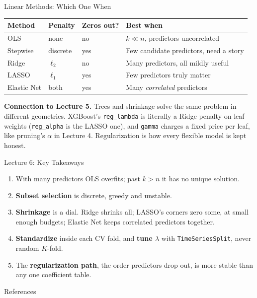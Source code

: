 \documentclass[aspectratio=169, 11pt]{beamer}
\begin{document}
\begin{frame}{Linear Methods: Which One When}
  \begin{center}
    {\small
    \begin{tabular}{llll}
      \toprule
      \textbf{Method} & \textbf{Penalty} & \textbf{Zeros out?} & \textbf{Best when} \\
      \midrule
      OLS & none & no & $k \ll n$, predictors uncorrelated \\
      Stepwise & discrete & yes & Few candidate predictors, need a story \\
      Ridge & $\ell_2$ & no & Many predictors, all mildly useful \\
      LASSO & $\ell_1$ & yes & Few predictors truly matter \\
      Elastic Net & both & yes & Many \emph{correlated} predictors \\
      \bottomrule
    \end{tabular}
    }
  \end{center}
  \vspace{0.15cm}
  \textbf{Connection to Lecture 5.} Trees and shrinkage solve the same problem in different
  geometries. XGBoost's \texttt{reg\_lambda} is literally a Ridge penalty on leaf weights
  (\texttt{reg\_alpha} is the LASSO one), and \texttt{gamma} charges a fixed price per leaf, like
  pruning's $\alpha$ in Lecture 4. Regularization is how every flexible model is kept honest.
\end{frame}

\begin{frame}{Lecture 6: Key Takeaways}
  \begin{keybox}
    {\footnotesize
    \begin{enumerate}\itemsep1pt
      \item With many predictors OLS overfits; past $k > n$ it has no unique solution.

      \item \textbf{Subset selection} is discrete, greedy and unstable.

      \item \textbf{Shrinkage} is a dial. Ridge shrinks all; LASSO's corners zero some, at
            small enough budgets; Elastic Net keeps correlated predictors together.

      \item \textbf{Standardize} inside each CV fold, and \textbf{tune $\lambda$} with
            \texttt{TimeSeriesSplit}, never random $K$-fold.

      \item The \textbf{regularization path}, the order predictors drop out, is more stable
            than any one coefficient table.
    \end{enumerate}
    }
  \end{keybox}
\end{frame}

\begin{frame}[allowframebreaks]{References}
  \renewcommand*{\bibfont}{\small}
  \printbibliography[heading=none]
\end{frame}

\end{document}
